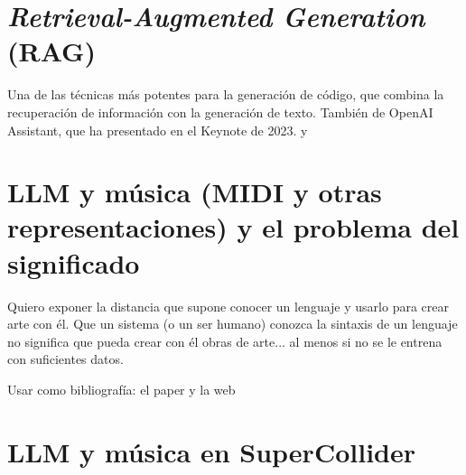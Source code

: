 \section{\textit{Retrieval-Augmented Generation} (RAG)}
    Una de las técnicas más potentes para la generación de código, que combina la recuperación de información con la generación de texto. También de OpenAI Assistant, que ha presentado en el Keynote de 2023. \cite{WhatRetrievalaugmentedGeneration2021} y \cite{lewisRetrievalAugmentedGenerationKnowledgeIntensive2021}

\section{LLM y música (MIDI y otras representaciones) y el problema del significado}
    Quiero exponer la distancia que supone conocer un lenguaje y usarlo para crear arte con él. Que un sistema (o un ser humano) conozca la sintaxis de un lenguaje no significa que pueda crear con él obras de arte... al menos si no se le entrena con suficientes datos.
    
    Usar como bibliografía: el paper \cite{lewisRetrievalAugmentedGenerationKnowledgeIntensive2021} y la web \cite{WhatRetrievalaugmentedGeneration2021}

\section{LLM y música en SuperCollider}